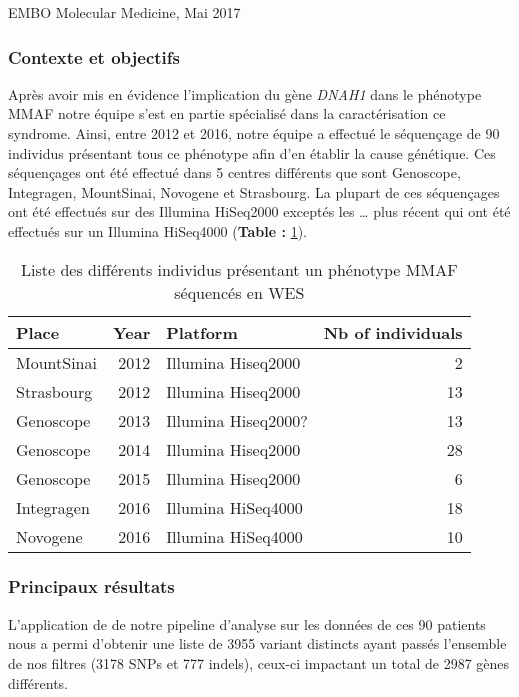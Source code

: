 \documentclass[12pt,twoside]{reedthesis}
\theoremstyle{definition}
\theoremstyle{definition}
\theoremstyle{remark}
\begin{document}
  EMBO Molecular Medicine, Mai 2017
  
  \newpage
  
  \subsubsection{Contexte et objectifs}\label{contexte-et-objectifs-4}
  
  Après avoir mis en évidence l'implication du gène \emph{DNAH1} dans le
  phénotype MMAF notre équipe s'est en partie spécialisé dans la
  caractérisation ce syndrome. Ainsi, entre 2012 et 2016, notre équipe a
  effectué le séquençage de 90 individus présentant tous ce phénotype afin
  d'en établir la cause génétique. Ces séquençages ont été effectué dans 5
  centres différents que sont Genoscope, Integragen, MountSinai, Novogene
  et Strasbourg. La plupart de ces séquençages ont été effectués sur des
  Illumina HiSeq2000 exceptés les \ldots{} plus récent qui ont été
  effectués sur un Illumina HiSeq4000 (\textbf{Table :
  }\ref{tab:tabrunbigmmaf}).
  
  \begin{longtable}[t]{lrlr}
  \caption{\label{tab:tabrunbigmmaf}Liste des différents individus présentant un phénotype MMAF séquencés en WES}\\
  \toprule
  Place & Year & Platform & Nb of individuals\\
  \midrule
  MountSinai & 2012 & Illumina Hiseq2000 & 2\\
  Strasbourg & 2012 & Illumina Hiseq2000 & 13\\
  Genoscope & 2013 & Illumina Hiseq2000? & 13\\
  Genoscope & 2014 & Illumina Hiseq2000 & 28\\
  Genoscope & 2015 & Illumina Hiseq2000 & 6\\
  \addlinespace
  Integragen & 2016 & Illumina HiSeq4000 & 18\\
  Novogene & 2016 & Illumina HiSeq4000 & 10\\
  \bottomrule
  \end{longtable}
  
  
  
  \newpage
  
  \subsubsection{Principaux résultats}\label{principaux-resultats-4}
  
  L'application de de notre pipeline d'analyse sur les données de ces 90
  patients nous a permi d'obtenir une liste de 3955 variant distincts
  ayant passés l'ensemble de nos filtres (3178 SNPs et 777 indels),
  ceux-ci impactant un total de 2987 gènes différents.
  
\end{document}
